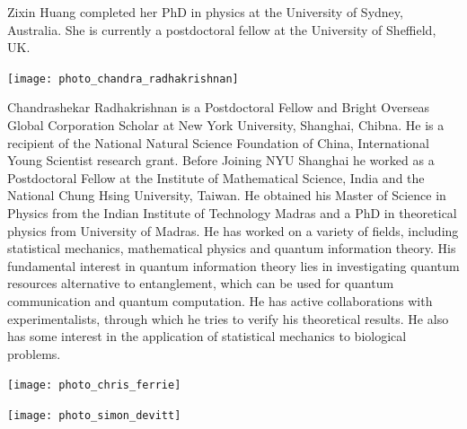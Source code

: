 Zixin Huang completed her PhD in physics at the University of Sydney, Australia. She is currently a postdoctoral fellow at the University of Sheffield, UK.


%
%

\begin{center}
\texttt{[image: photo\_chandra\_radhakrishnan]}
\end{center}

Chandrashekar Radhakrishnan is a Postdoctoral Fellow and Bright Overseas Global Corporation Scholar at New York University, Shanghai, Chibna. He is a recipient of the National Natural Science Foundation of China, International Young Scientist research grant. Before Joining NYU Shanghai he worked as a Postdoctoral Fellow at the Institute of Mathematical Science, India and the National Chung Hsing University, Taiwan. He obtained his Master of Science in Physics from the Indian Institute of Technology Madras and a PhD in theoretical physics from University of Madras. He has worked on a variety of fields, including statistical mechanics, mathematical physics and quantum information theory. His fundamental interest in quantum information theory lies in investigating quantum resources alternative to entanglement, which can be used for quantum communication and quantum computation. He has active collaborations with experimentalists, through which he tries to verify his theoretical results. He also has some interest in the application of statistical mechanics to biological problems.

%
%

\begin{center}
\texttt{[image: photo\_chris\_ferrie]}
\end{center}


%
%

\begin{center}
\texttt{[image: photo\_simon\_devitt]}
\end{center}


%
%

